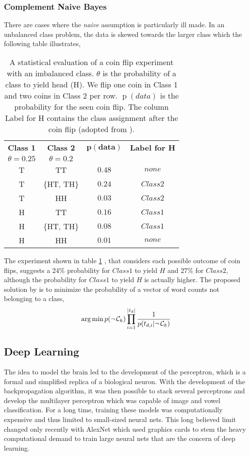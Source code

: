 \subsubsection{Complement Naive Bayes}
There are cases where the \textsl{naive} assumption is particularly ill made. In an unbalanced class problem, the data is skewed towards the larger class which the following table illustrates,

\begin{table}[h!]
  \centering
  \caption{A statistical evaluation of a coin flip experiment with an imbalanced class. $\theta$ is the probability of a class to yield head (H). We flip one coin in Class 1 and two coins in Class 2 per row. $\operatorname{p}(data)$ is the probability for the seen coin flip. The column Label for H contains the class assignment after the coin flip (adopted from \cite{Rennie2003}).}
  \setlength{\tabcolsep}{1.5em}
  \begin{tabular}{@{}cccc@{}}
    \toprule
    \textbf{Class 1} & \textbf{Class 2} & $\mathbf{p(data)}$ & \textbf{Label for H} \\
    $\theta = 0.25$ & $\theta=0.2$ & & \\
    \midrule
    T & TT & $0.48$ & $none$ \\
    T & \{HT, TH\} & $0.24$ & $Class 2$ \\
    T & HH & $0.03$ & $Class 2$ \\
    H & TT & $0.16$ & $Class 1$ \\
    H & \{HT, TH\} & $0.08$ & $Class 1$ \\
    H & HH & $0.01$ & $none$ \\
    \bottomrule
  \end{tabular}
  \label{table:coinflip}
\end{table}
The experiment shown in table \ref{table:coinflip} , that considers each possible outcome of coin flips, suggests a 24\% probability for $Class 1$ to yield $H$ and 27\% for $Class 2$, although the probability for $Class 1$ to yield $H$ is actually higher.
The proposed solution by \cite{Rennie2003} is to minimize the probability of a vector of word counts not belonging to a class,
\[\operatorname*{arg\,min} p(\neg\, \mathcal{C}_k) \prod_{i=1}^{|t_{d}|} \frac{1}{p(t_{d,i}|\neg\, \mathcal{C}_k)} \]

\subsection{Deep Learning}
The idea to model the brain led to the development of the perceptron, which is a formal and simplified replica of a biological neuron. With the development of the backpropagation algorithm, it was then possible to stack several perceptrons and develop the multilayer perceptron which was capable of image and vowel classification. For a long time, training these models was computationally expensive and thus limited to small-sized neural nets. This long believed limit changed only recently with AlexNet which used graphics cards to stem the heavy computational demand to train large neural nets that are the concern of deep learning.

